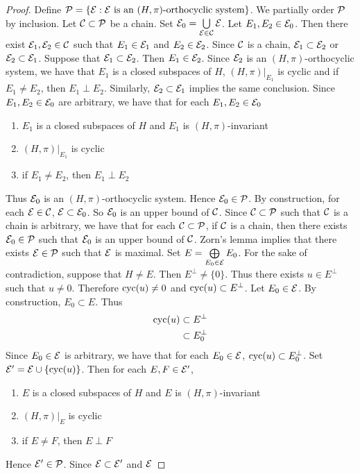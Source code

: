\documentclass{book}
\begin{document}
	\begin{proof}
		Define $\mathcal{P} = \{\mathcal{E}: \text{$\mathcal{E}$ is an $(H, \pi)$-orthocyclic system}\}$. We partially order $\mathcal{P}$ by inclusion. Let $\mathcal{C} \subset \mathcal{P}$ be a chain. Set $\mathcal{E}_0 = \bigcup\limits_{\mathcal{E} \in \mathcal{C}} \mathcal{E}$. Let $E_1, E_2 \in \mathcal{E}_0$. Then there exist $\mathcal{E}_1, \mathcal{E}_2 \in \mathcal{C}$ such that $E_1 \in \mathcal{E}_1$ and $E_2 \in \mathcal{E}_2$. Since $\mathcal{C}$ is a chain, $\mathcal{E}_1 \subset \mathcal{E}_2$ or $\mathcal{E}_2 \subset \mathcal{E}_1$. Suppose that $\mathcal{E}_1 \subset \mathcal{E}_2$. Then $E_1 \in \mathcal{E}_2$. Since $\mathcal{E}_2$ is an $(H, \pi)$-orthocyclic system, we have that $E_1$ is a closed subspaces of $H$, $(H, \pi)|_{E_1}$ is cyclic and if $E_1 \neq E_2$, then $E_1 \perp E_2$. Similarly, $\mathcal{E}_2 \subset \mathcal{E}_1$ implies the same conclusion. Since $E_1, E_2 \in \mathcal{E}_0$ are arbitrary, we have that for each $E_1, E_2 \in \mathcal{E}_0$ 
	 	\begin{enumerate}
	 		\item $E_1$ is a closed subspaces of $H$ and $E_1$ is $(H, \pi)$-invariant
	 		\item $(H, \pi)|_{E_1}$ is cyclic
	 		\item if $E_1 \neq E_2$, then $E_1 \perp E_2$
	 	\end{enumerate}
 		Thus $\mathcal{E}_0$ is an $(H, \pi)$-orthocyclic system. Hence $\mathcal{E}_0 \in \mathcal{P}$. By construction, for each $\mathcal{E} \in \mathcal{C}$, $\mathcal{E} \subset \mathcal{E}_0$. So $\mathcal{E}_0$ is an upper bound of $\mathcal{C}$. Since $\mathcal{C} \subset \mathcal{P}$ such that $\mathcal{C}$ is a chain is arbitrary, we have that for each $\mathcal{C} \subset \mathcal{P}$, if $\mathcal{C}$ is a chain, then there exists $\mathcal{E}_0 \in \mathcal{P}$ such that $\mathcal{E}_0$ is an upper bound of $\mathcal{C}$. Zorn's lemma implies that there exists $\mathcal{E} \in \mathcal{P}$ such that $\mathcal{E}$ is maximal. Set $E =  \bigoplus\limits_{E_0 \in \mathcal{E}} E_0$. For the sake of contradiction, suppose that $H \neq E$. Then $E^{\perp} \neq \{0\}$. Thus there exists $u \in E^{\perp}$ such that $u \neq 0$. Therefore $\operatorname{cyc}(u) \neq 0$ and $\operatorname{cyc}(u) \subset E^{\perp}$. Let $E_0 \in \mathcal{E}$. By construction, $E_0 \subset E$. Thus
 		\begin{align*}
 			\operatorname{cyc}(u) 
 			& \subset E^{\perp} \\
 			& \subset E_0^{\perp}
 		\end{align*}
 		Since $E_0 \in \mathcal{E}$ is arbitrary, we have that for each $E_0 \in \mathcal{E}$, $\operatorname{cyc}(u) \subset E_0^{\perp}$. Set $\mathcal{E}' = \mathcal{E} \cup \{\operatorname{cyc}(u)\}$. Then for each $E,F \in \mathcal{E}'$, 
 		\begin{enumerate}
 			\item $E$ is a closed subspaces of $H$ and $E$ is $(H, \pi)$-invariant
 			\item $(H, \pi)|_{E}$ is cyclic
 			\item if $E \neq F$, then $E \perp F$
 		\end{enumerate}
 		Hence $\mathcal{E}' \in \mathcal{P}$. Since $\mathcal{E} \subset \mathcal{E}'$ and $\mathcal{E}$
	\end{proof}
\end{document}
